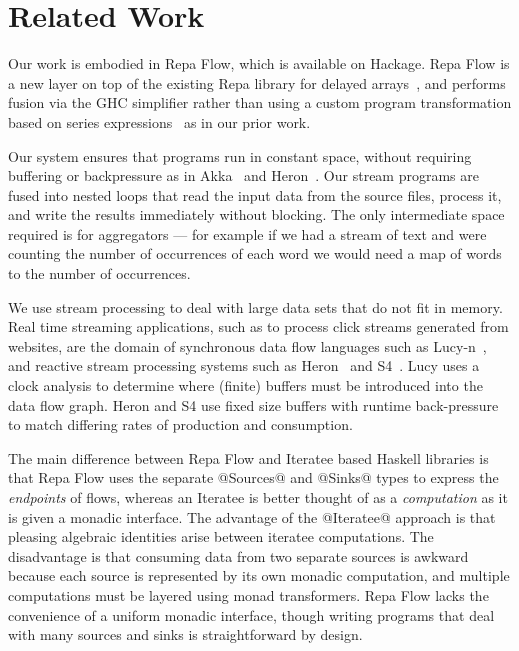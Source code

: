 \section{Related Work}
Our work is embodied in Repa Flow, which is available on Hackage. Repa Flow is a new layer on top of the existing Repa library for delayed arrays~\cite{Lippmeier:Guiding}, and performs fusion via the GHC simplifier rather than using a custom program transformation based on series expressions~\cite{Lippmeier:DataFlow} as in our prior work.

Our system ensures that programs run in constant space, without requiring buffering or backpressure as in Akka~\cite{github:akka} and Heron~\cite{Kulkarn:Heron}. Our stream programs are fused into nested loops that read the input data from the source files, process it, and write the results immediately without blocking. The only intermediate space required is for aggregators --- for example if we had a stream of text and were counting the number of occurrences of each word we would need a map of words to the number of occurrences. 

We use stream processing to deal with large data sets that do not fit in memory. Real time streaming applications, such as to process click streams generated from websites, are the domain of synchronous data flow languages such as Lucy-n~\cite{Mandel:Lucy}, and reactive stream processing systems such as Heron~\cite{Kulkarn:Heron} and S4~\cite{Neumeyer:S4}. Lucy uses a clock analysis to determine where (finite) buffers must be introduced into the data flow graph. Heron and S4 use fixed size buffers with runtime back-pressure to match differing rates of production and consumption.

The main difference between Repa Flow and Iteratee based Haskell libraries 
\cite{Kiselyov:iteratee, hackage:enumerator, hackage:conduit, hackage:pipes} is that Repa Flow uses the separate @Sources@ and @Sinks@ types to express the \emph{endpoints} of flows, whereas an Iteratee is better thought of as a \emph{computation} as it is given a monadic interface. The advantage of the @Iteratee@ approach is that pleasing algebraic identities arise between iteratee computations. The disadvantage is that consuming data from two separate sources is awkward because each source is represented by its own monadic computation, and multiple computations must be layered using monad transformers. Repa Flow lacks the convenience of a uniform monadic interface, though writing programs that deal with many sources and sinks is straightforward by design.

